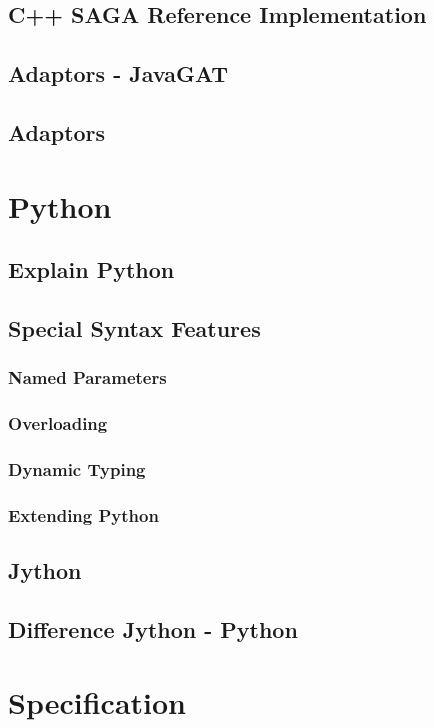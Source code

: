 \documentclass[a4paper,11pt,onecolumn,notitlepage]{article}
\begin{document}
\subsection{C++ SAGA Reference Implementation}
\subsection{Adaptors - JavaGAT}
\subsection{Adaptors}
\pagebreak[0]

\section{Python}
\subsection{Explain Python}
\subsection{Special Syntax Features}
\subsubsection{Named Parameters}
\subsubsection{Overloading}
\subsubsection{Dynamic Typing}
\subsubsection{Extending Python}
\subsection{Jython}
\subsection{Difference Jython - Python}
\pagebreak[0]



\section{Specification}
\end{document}
